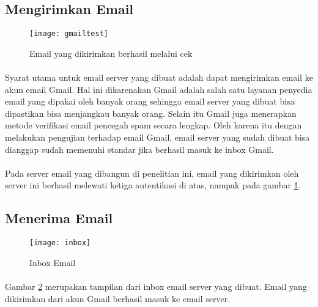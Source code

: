 \documentclass[./bab_4.tex]{subfiles}
\begin{document}
\subsection{Mengirimkan Email}
\begin{figure}[ht!]
  \begin{center}
    \texttt{[image: gmailtest]}
  \end{center}
  \caption{Email yang dikirimkan berhasil melalui cek}
  \label{gmaitest}
\end{figure}
\paragraph*{}Syarat utama untuk email server yang dibuat
adalah dapat mengirimkan email ke akun email Gmail. Hal ini
dikarenakan Gmail adalah salah satu layanan penyedia email
yang dipakai oleh banyak orang sehingga email server yang
dibuat bisa dipastikan bisa menjangkau banyak orang. Selain
itu Gmail juga menerapkan metode verifikasi email pencegah
spam secara lengkap. Oleh karena itu dengan melakukan pengujian
terhadap email Gmail, email server yang sudah dibuat bisa
dianggap sudah memenuhi standar jika berhasil masuk ke inbox
Gmail.

\paragraph*{}Pada server email yang dibangun di penelitian
ini, email yang dikirimkan oleh server ini berhasil melewati
ketiga autentikasi di atas, nampak pada gambar
\ref{gmaitest}.

\subsection{Menerima Email}
\begin{figure}[!ht]
  \begin{center}
    \texttt{[image: inbox]}
  \end{center}
  \caption{Inbox Email}
  \label{inbox}
\end{figure}
\paragraph*{}Gambar \ref{inbox} merupakan tampilan dari
inbox email server yang dibuat. Email yang dikirimkan dari
akun Gmail berhasil masuk ke email server.
\end{document}
